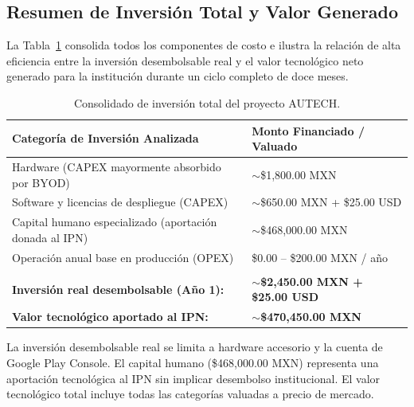 \subsection{Resumen de Inversión Total y Valor Generado}
\label{subsec:resumen_inversion}

La Tabla~\ref{tab:resumen_costos} consolida todos los componentes de costo e ilustra la relación de alta eficiencia entre la inversión desembolsable real y el valor tecnológico neto generado para la institución durante un ciclo completo de doce meses.

\begin{table}[htbp]
\centering
\caption{Consolidado de inversión total del proyecto AUTECH.}
\label{tab:resumen_costos}
\setlength{\tabcolsep}{4pt}
\renewcommand{\arraystretch}{1.2}
\scriptsize
\begin{tabularx}{\textwidth}{@{} >{\raggedright\arraybackslash}X >{\raggedleft\arraybackslash}p{5.5cm} @{}}
\toprule
\textbf{Categoría de Inversión Analizada} &
\textbf{Monto Financiado / Valuado} \\
\midrule

Hardware (CAPEX mayormente absorbido por BYOD)
  & ${\sim}$\$1{,}800.00 MXN \\

Software y licencias de despliegue (CAPEX)
  & ${\sim}$\$650.00 MXN + \$25.00 USD \\

Capital humano especializado (aportación donada al IPN)
  & ${\sim}$\$468{,}000.00 MXN \\

Operación anual base en producción (OPEX)
  & \$0.00 -- \$200.00 MXN / año \\

\midrule
\multicolumn{2}{@{}l}{\cellcolor{gray!8}} \\[-1.8ex]

\multicolumn{1}{@{} >{\raggedright\arraybackslash}X}%
  {\cellcolor{gray!8}\textbf{Inversión real desembolsable (Año 1):}} &
  \multicolumn{1}{>{\raggedleft\arraybackslash}p{5.5cm} @{}}%
  {\cellcolor{gray!8}${\sim}$\textbf{\$2{,}450.00 MXN + \$25.00 USD}} \\

\multicolumn{1}{@{} >{\raggedright\arraybackslash}X}%
  {\cellcolor{gray!8}\textbf{Valor tecnológico aportado al IPN:}} &
  \multicolumn{1}{>{\raggedleft\arraybackslash}p{5.5cm} @{}}%
  {\cellcolor{gray!8}${\sim}$\textbf{\$470{,}450.00 MXN}} \\

\bottomrule
\end{tabularx}

\vspace{3pt}
\begin{minipage}{\textwidth}
  \scriptsize
  La inversión desembolsable real se limita a hardware accesorio y la cuenta de
  Google Play Console. El capital humano (\$468{,}000.00 MXN) representa una
  aportación tecnológica al IPN sin implicar desembolso institucional. El valor
  tecnológico total incluye todas las categorías valuadas a precio de mercado.
\end{minipage}
\end{table}

